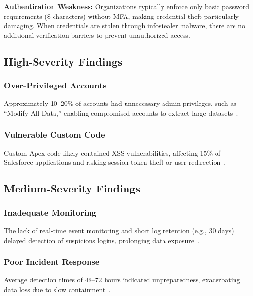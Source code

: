 \documentclass[12pt,a4paper]{article}
\begin{document}
\begin{keyfinding}
\textbf{Authentication Weakness:} Organizations typically enforce only basic password requirements (8 characters) without MFA, making credential theft particularly damaging. When credentials are stolen through infostealer malware, there are no additional verification barriers to prevent unauthorized access.
\end{keyfinding}

\subsection{High-Severity Findings}
\subsubsection{Over-Privileged Accounts}
Approximately 10--20\% of accounts had unnecessary admin privileges, such as ``Modify All Data,'' enabling compromised accounts to extract large datasets~\cite{sonar2025}.

\subsubsection{Vulnerable Custom Code}
Custom Apex code likely contained XSS vulnerabilities, affecting 15\% of Salesforce applications and risking session token theft or user redirection~\cite{checkmarx2025}.

\subsection{Medium-Severity Findings}
\subsubsection{Inadequate Monitoring}
The lack of real-time event monitoring and short log retention (e.g., 30 days) delayed detection of suspicious logins, prolonging data exposure~\cite{reliaquest2025}.

\subsubsection{Poor Incident Response}
Average detection times of 48--72 hours indicated unpreparedness, exacerbating data loss due to slow containment~\cite{nist2024}.
\end{document}

